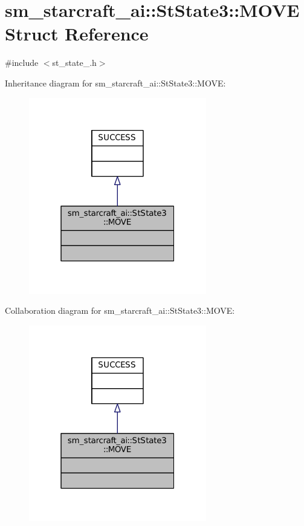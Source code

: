 \hypertarget{structsm__starcraft__ai_1_1StState3_1_1MOVE}{}\section{sm\+\_\+starcraft\+\_\+ai\+:\+:St\+State3\+:\+:M\+O\+VE Struct Reference}
\label{structsm__starcraft__ai_1_1StState3_1_1MOVE}


{\ttfamily \#include $<$st\+\_\+state\+\_.\+h$>$}



Inheritance diagram for sm\+\_\+starcraft\+\_\+ai\+:\+:St\+State3\+:\+:M\+O\+VE\+:
\nopagebreak
\begin{figure}[H]
\begin{center}
\leavevmode
\includegraphics[width=220pt]{structsm__starcraft__ai_1_1StState3_1_1MOVE__inherit__graph}
\end{center}
\end{figure}


Collaboration diagram for sm\+\_\+starcraft\+\_\+ai\+:\+:St\+State3\+:\+:M\+O\+VE\+:
\nopagebreak
\begin{figure}[H]
\begin{center}
\leavevmode
\includegraphics[width=220pt]{structsm__starcraft__ai_1_1StState3_1_1MOVE__coll__graph}
\end{center}
\end{figure}


